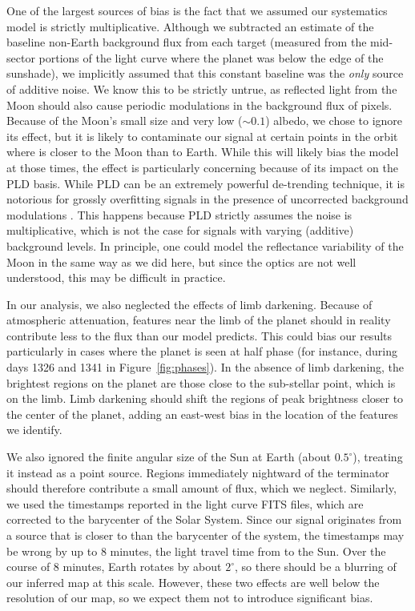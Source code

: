 \documentclass[modern]{aastex62}
\begin{document}
One of the largest sources of bias is the fact that we assumed our
systematics model is strictly multiplicative. Although we subtracted
an estimate of the baseline non-Earth background flux from each target
(measured from the mid-sector portions of the light curve where the
planet was below the edge of the sunshade), we implicitly assumed
that this constant baseline was the \emph{only} source of additive
noise. We know this to be strictly untrue, as reflected light from the Moon 
should also cause periodic modulations
in the background flux of \TESS pixels. Because of the Moon's small size and
very low ($\sim 0.1$) albedo, we chose to ignore its effect, but it
is likely to contaminate our signal at certain points in the orbit
where \TESS is closer to the Moon than to Earth. While this will
likely bias the \starry model at those times, the effect is particularly
concerning because of its impact on the PLD basis. While PLD can be an
extremely powerful de-trending technique, it is notorious for
grossly overfitting signals in the presence of uncorrected background
modulations \citep{Luger2016}. This happens because PLD strictly
assumes the noise is multiplicative, which is not the case for 
signals with varying (additive) background levels. In principle, one
could model the reflectance variability of the Moon in the same way as
we did here, but since the optics are not well understood, this 
may be difficult in practice. 

In our analysis, we also neglected the effects of limb darkening. Because of
atmospheric attenuation, features near the limb of the planet should in
reality contribute less to the flux than our model predicts. This could
bias our results particularly in cases where the planet is seen at half
phase (for instance, during days 1326 and 1341 in Figure~\ref{fig:phases}).
In the absence of limb darkening, the brightest regions on the planet are those
close to the sub-stellar point, which is on the limb. Limb darkening should
shift the regions of peak brightness closer to the center of the planet, adding
an east-west bias in the location of the features we identify.

We also ignored the finite angular size of the Sun at Earth (about $0.5^\circ$),
treating it instead as a point source. Regions immediately nightward of the 
terminator should therefore contribute a small amount of flux, which we neglect.
Similarly, we used the timestamps reported in the \tess light curve
FITS files, which are corrected to the barycenter of the Solar System. Since
our signal originates from a source that is closer to \tess than the
barycenter of the system, the timestamps may be wrong by up to 8 minutes,
the light travel time from \tess to the Sun. Over the course of 8 minutes, Earth rotates
by about $2^\circ$, so there should be a blurring of our inferred map at
this scale. However, these two effects
are well below the resolution of our map, so we expect
them not to introduce significant bias.
\end{document}
